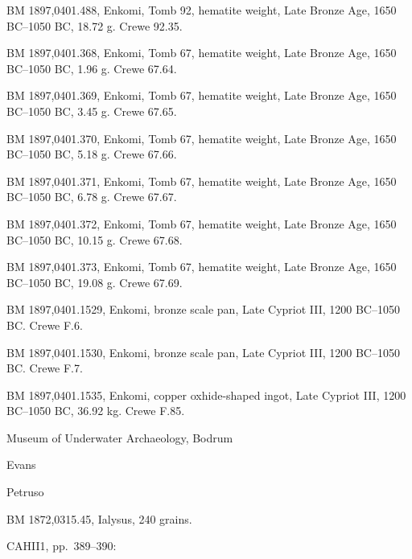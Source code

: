 \documentclass{article}
\begin{document}
BM 1897,0401.488, Enkomi, Tomb 92, hematite weight,
Late Bronze Age, 1650 BC--1050 BC,
18.72 g.
Crewe 92.35.

BM 1897,0401.368, Enkomi, Tomb 67, hematite weight,
Late Bronze Age, 1650 BC--1050 BC,
1.96 g.
Crewe 67.64.

BM 1897,0401.369, Enkomi, Tomb 67, hematite weight,
Late Bronze Age, 1650 BC--1050 BC,
3.45 g.
Crewe 67.65.

BM 1897,0401.370, Enkomi, Tomb 67, hematite weight,
Late Bronze Age, 1650 BC--1050 BC,
5.18 g.
Crewe 67.66.

BM 1897,0401.371, Enkomi, Tomb 67, hematite weight,
Late Bronze Age, 1650 BC--1050 BC,
6.78 g.
Crewe 67.67.

BM 1897,0401.372, Enkomi, Tomb 67, hematite weight,
Late Bronze Age, 1650 BC--1050 BC,
10.15 g.
Crewe 67.68.

BM 1897,0401.373, Enkomi, Tomb 67, hematite weight,
Late Bronze Age, 1650 BC--1050 BC,
19.08 g.
Crewe 67.69.

BM 1897,0401.1529, Enkomi, bronze scale pan,
Late Cypriot III, 1200 BC--1050 BC.
Crewe F.6.

BM 1897,0401.1530, Enkomi, bronze scale pan,
Late Cypriot III, 1200 BC--1050 BC.
Crewe F.7.

BM 1897,0401.1535, Enkomi, copper oxhide-shaped ingot,
Late Cypriot III, 1200 BC--1050 BC,
36.92 kg.
Crewe F.85.






Museum of Underwater Archaeology, Bodrum

Evans \cite{corolla}


Petruso \cite{petruso}








BM 1872,0315.45, Ialysus, 240 grains.




CAHII1, pp.~389--390:
\end{document}

